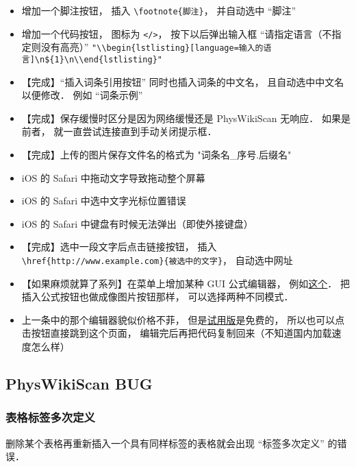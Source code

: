 \begin{itemize}
\item 增加一个脚注按钮， 插入 \lstinline|\footnote{脚注}|， 并自动选中 “脚注”

\item 增加一个代码按钮， 图标为 \lstinline|</>|， 按下以后弹出输入框 “请指定语言（不指定则没有高亮）” \lstinline|"\\begin{lstlisting}[language=输入的语言]\n${1}\n\\end{lstlisting}"|

\item 【完成】“插入词条引用按钮” 同时也插入词条的中文名， 且自动选中中文名以便修改． 例如 “词条示例”

\item 【完成】保存缓慢时区分是因为网络缓慢还是 PhysWikiScan 无响应． 如果是前者， 就一直尝试连接直到手动关闭提示框．

\item 【完成】上传的图片保存文件名的格式为 "词条名_序号.后缀名"

\item iOS 的 Safari 中拖动文字导致拖动整个屏幕

\item iOS 的 Safari 中选中文字光标位置错误

\item iOS 的 Safari 中键盘有时候无法弹出（即使外接键盘）

\item 【完成】选中一段文字后点击链接按钮， 插入 \lstinline|\href{http://www.example.com}{被选中的文字}|， 自动选中网址

\item 【如果麻烦就算了系列】在菜单上增加某种 GUI 公式编辑器， 例如\href{http://latex.codecogs.com/eqneditor/editor.php}{这个}． 把插入公式按钮也做成像图片按钮那样， 可以选择两种不同模式．

\item 上一条中的那个编辑器貌似价格不菲， 但是\href{https://www.codecogs.com/latex/eqneditor.php?lang=zh-cn}{试用版}是免费的， 所以也可以点击按钮直接跳到这个页面， 编辑完后再把代码复制回来（不知道国内加载速度怎么样）
\end{itemize}

\subsection{PhysWikiScan BUG}

\subsubsection{表格标签多次定义}
删除某个表格再重新插入一个具有同样标签的表格就会出现 “标签多次定义” 的错误．

